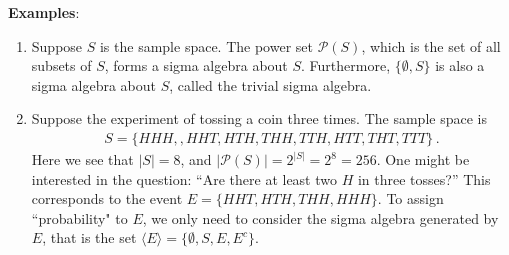 \documentclass[11pt,oneside]{book}
\theoremstyle{newStyle}
\begin{document}
\vspace{2cm}
\textbf{Examples}:
\begin{enumerate}
\item Suppose $S$ is the sample space. The power set $\mathcal{P}(S)$, which is the set of all subsets of $S$, forms a sigma algebra about $S$. Furthermore, $\{\emptyset, S\}$ is also a sigma algebra about $S$, called the trivial sigma algebra. 
\item Suppose the experiment of tossing a coin three times. The sample space is 
\begin{align*}
S = \{HHH,, HHT, HTH, THH, TTH, HTT, THT, TTT\}\,.
\end{align*}
Here we see that $|S| = 8$, and $|\mathcal{P}(S)| = 2^{|S|} = 2^8 = 256$. One might be interested in the question: ``Are there at least two $H$ in three tosses?'' This corresponds to the event $E = \{HHT, HTH, THH, HHH\}$. To assign ``probability" to $E$, we only need to consider the sigma algebra generated by $E$, that is the set $\langle E \rangle = \{\emptyset, S, E, E^c\}$. 
\end{enumerate}
\end{document}
